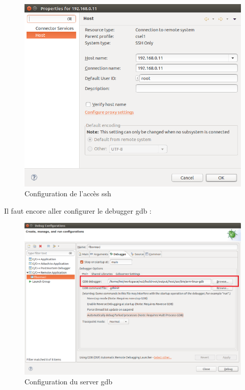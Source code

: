 \begin{figure}[H]
	\begin{center}
		\includegraphics[width=14cm]{img/eclipseConfig2.png}
		\caption{Configuration de l'accès ssh}
		\label{eclipseConfig2}
	\end{center}
\end{figure}
Il faut encore aller configurer le debugger gdb :
\begin{figure}[H]
	\begin{center}
		\includegraphics[width=14cm]{img/eclipseConfig3.png}
		\caption{Configuration du server gdb}
		\label{eclipseConfig3}
	\end{center}
\end{figure}
